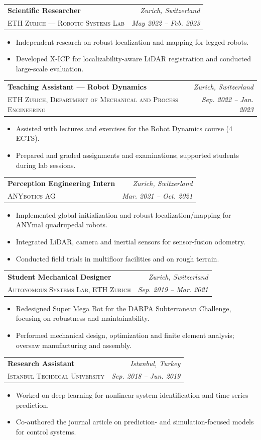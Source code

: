 \documentclass[10pt,a4paper]{article}
\makeatletter
\newcommand{\job}[4]{\par\Needspace{6\baselineskip}\begin{tabularx}{\linewidth}{@{}Xr@{}}\textbf{#1}&\textit{#2}\\{\small\scshape #3}&{\color{muted}\small\textit{#4}}\end{tabularx}\par}
\makeatother
\begin{document}
\job{Scientific Researcher}{Zurich, Switzerland}{ETH Zurich — Robotic Systems Lab}{May 2022 – Feb. 2023}
\begin{itemize}\item Independent research on robust localization and mapping for legged robots.
\item Developed X-ICP for localizability-aware LiDAR registration and conducted large-scale evaluation.\end{itemize}\vspace{5pt}
\job{Teaching Assistant — Robot Dynamics}{Zurich, Switzerland}{ETH Zurich, Department of Mechanical and Process Engineering}{Sep. 2022 – Jan. 2023}
\begin{itemize}\item Assisted with lectures and exercises for the Robot Dynamics course (4 ECTS).
\item Prepared and graded assignments and examinations; supported students during lab sessions.\end{itemize}\vspace{5pt}
\job{Perception Engineering Intern}{Zurich, Switzerland}{ANYbotics AG}{Mar. 2021 – Oct. 2021}
\begin{itemize}\item Implemented global initialization and robust localization/mapping for ANYmal quadrupedal robots.
\item Integrated LiDAR, camera and inertial sensors for sensor-fusion odometry.
\item Conducted field trials in multifloor facilities and on rough terrain.\end{itemize}\vspace{5pt}
\job{Student Mechanical Designer}{Zurich, Switzerland}{Autonomous Systems Lab, ETH Zurich}{Sep. 2019 – Mar. 2021}
\begin{itemize}\item Redesigned Super Mega Bot for the DARPA Subterranean Challenge, focusing on robustness and maintainability.
\item Performed mechanical design, optimization and finite element analysis; oversaw manufacturing and assembly.\end{itemize}\vspace{5pt}
\job{Research Assistant}{Istanbul, Turkey}{Istanbul Technical University}{Sep. 2018 – Jun. 2019}
\begin{itemize}\item Worked on deep learning for nonlinear system identification and time-series prediction.
\item Co-authored the journal article on prediction- and simulation-focused models for control systems.\end{itemize}\vspace{5pt}
\end{document}
